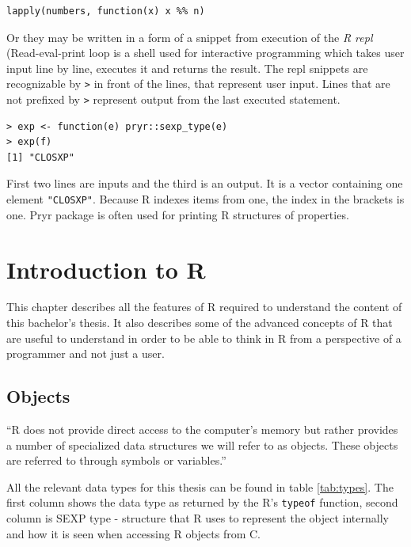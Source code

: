 \documentclass[thesis=B,english]{FITthesis}[2012/10/20]
\begin{document}
\begin{verbatim}
lapply(numbers, function(x) x %% n)
\end{verbatim}

Or they may be written in a form of a snippet from execution of the \emph{R repl} (Read-eval-print loop is a shell used for interactive programming which takes user input line by line, executes it and returns the result. The repl snippets are recognizable by \verb|>| in front of the lines, that represent user input. Lines that are not prefixed by \verb|>| represent output from the last executed statement.

\begin{verbatim}
> exp <- function(e) pryr::sexp_type(e)
> exp(f)
[1] "CLOSXP"

\end{verbatim}

First two lines are inputs and the third is an output. It is a vector containing one element \verb|"CLOSXP"|. Because R indexes items from one, the index in the brackets is one. Pryr package\cite{pryr} is often used for printing R structures of properties.


\chapter{Introduction to R}
This chapter describes all the features of R required to understand the content of this bachelor’s thesis. It also describes some of the advanced concepts of R that are useful to understand in order to be able to think in R from a perspective of a programmer and not just a user.

\section{Objects}
``R does not provide direct access to the computer’s memory but rather provides a number of specialized data structures we will refer to as objects. These objects are referred to through symbols or variables.'' \cite{specs}

All the relevant data types for this thesis can be found in table \ref{tab:types}. The first column shows the data type as returned by the R’s \verb|typeof| function, second column is SEXP type - structure that R uses to represent the object internally and how it is seen when accessing R objects from C.
\end{document}
